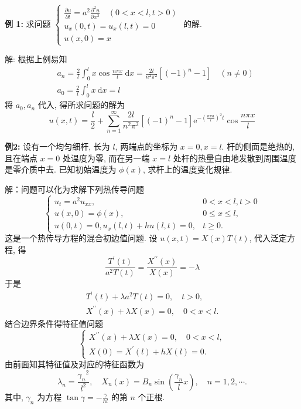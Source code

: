 \textbf{例 1: }求问题 $ \left\{\begin{array}{l}\frac{\partial u}{\partial t}=a^{2} \frac{\partial^{2} u}{\partial x^{2}} \quad(0<x<l, t>0) \\ u_{x}(0, t)=u_{x}(l, t)=0 \\ u(x, 0)=x\end{array}\right. $ 的解.

解: 根据上例易知
$$
\begin{aligned}
&a_{n}=\frac{2}{l} \int_{0}^{l} x \cos \frac{n \pi x}{l} \mathrm{~d} x=\frac{2 l}{n^{2} \pi^{2}}\left[(-1)^{n}-1\right] \quad(n \neq 0) \\
&a_{0}=\frac{2}{l} \int_{0}^{l} x \mathrm{~d} x=l
\end{aligned}
$$
将 $ a_{0} , a_{n} $ 代入, 得所求问题的解为
$$
u(x, t)=\frac{l}{2}+\sum_{n=1}^{\infty} \frac{2 l}{n^{2} \pi^{2}}\left[(-1)^{n}-1\right] \mathrm{e}^{-\left(\frac{n \pi a}{l}\right)^{2} t} \cos \frac{n \pi x}{l}
$$

\textbf{例2: }设有一个均匀细杆, 长为 $ l $, 两端点的坐标为 $ x=0, x=l $. 杆的侧面是绝热的,且在端点 $ x=0 $ 处温度为零, 而在另一端 $ x=l $ 处杆的热量自由地发散到周围温度是零介质中去. 已知初始温度为 $ \phi(x) $, 求杆上的温度变化规律.

 解：问题可以化为求解下列热传导问题
$$
\left\{\begin{array}{ll}
u_{t}=a^{2} u_{x x}, & 0 < x < l,t>0 \\
u(x, 0)=\phi(x), & 0 \leqslant x \leqslant l, \\
u(0, t)=0, u_{x}(l, t)+h u(l, t)=0, &t \geqslant 0 .
\end{array}\right.
$$
 这是一个热传导方程的混合初边值问题. 设 $ u(x, t)=X(x) T(t) $, 代入泛定方程, 得
$$
\frac{T^{\prime}(t)}{a^{2} T(t)}=\frac{X^{\prime \prime}(x)}{X(x)}=-\lambda
$$
于是
$$
\begin{array}{c}
T^{\prime}(t)+\lambda a^{2} T(t)=0, \quad t>0, \\
X^{\prime \prime}(x)+\lambda X(x)=0, \quad 0<x<l .
\end{array}
$$
结合边界条件得特征值问题
$$
\left\{\begin{array}{l}
X^{\prime \prime}(x)+\lambda X(x)=0, \quad 0<x<l, \\
X(0)=X^{\prime}(l)+h X(l)=0 .
\end{array}\right.
$$
由前面知其特征值及对应的特征函数为
$$
\lambda_{n}=\frac{\gamma_{n}{ }^{2}}{l^{2}}, \quad X_{n}(x)=B_{n} \sin \left(\frac{\gamma_{n}}{l} x\right), \quad n=1,2, \cdots .
$$
其中, $ \gamma_{n} $ 为方程 $ \tan \gamma=-\frac{\gamma}{h l} $ 的第 $ n $ 个正根. 

